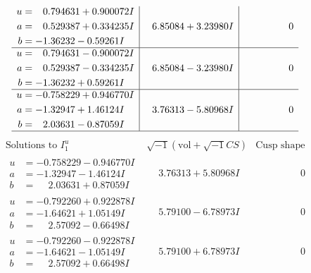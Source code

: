 \documentclass[1p]{elsarticle_modified}
\theoremstyle{definition}
\newcommand{\I}{\sqrt{-1}}
\begin{document}
$$\begin{array}{c|c|c}
\begin{aligned}
u &= \phantom{-}0.794631 + 0.900072 I \\
a &= \phantom{-}0.529387 + 0.334235 I \\
b &= -1.36232 - 0.59261 I\end{aligned}
 & \phantom{-}6.85084 + 3.23980 I & \phantom{-0.000000 } 0 \\ \hline\begin{aligned}
u &= \phantom{-}0.794631 - 0.900072 I \\
a &= \phantom{-}0.529387 - 0.334235 I \\
b &= -1.36232 + 0.59261 I\end{aligned}
 & \phantom{-}6.85084 - 3.23980 I & \phantom{-0.000000 } 0 \\ \hline\begin{aligned}
u &= -0.758229 + 0.946770 I \\
a &= -1.32947 + 1.46124 I \\
b &= \phantom{-}2.03631 - 0.87059 I\end{aligned}
 & \phantom{-}3.76313 - 5.80968 I & \phantom{-0.000000 } 0\\
 \hline 
 \end{array}$$\newpage$$\begin{array}{c|c|c}  
\text{Solutions to }I^u_{1}& \I (\text{vol} + \sqrt{-1}CS) & \text{Cusp shape}\\
 \hline 
\begin{aligned}
u &= -0.758229 - 0.946770 I \\
a &= -1.32947 - 1.46124 I \\
b &= \phantom{-}2.03631 + 0.87059 I\end{aligned}
 & \phantom{-}3.76313 + 5.80968 I & \phantom{-0.000000 } 0 \\ \hline\begin{aligned}
u &= -0.792260 + 0.922878 I \\
a &= -1.64621 + 1.05149 I \\
b &= \phantom{-}2.57092 - 0.66498 I\end{aligned}
 & \phantom{-}5.79100 - 6.78973 I & \phantom{-0.000000 } 0 \\ \hline\begin{aligned}
u &= -0.792260 - 0.922878 I \\
a &= -1.64621 - 1.05149 I \\
b &= \phantom{-}2.57092 + 0.66498 I\end{aligned}
 & \phantom{-}5.79100 + 6.78973 I & \phantom{-0.000000 } 0 \\ \hline\begin{aligned}

\end{aligned}
\end{array}$$
\end{document}
